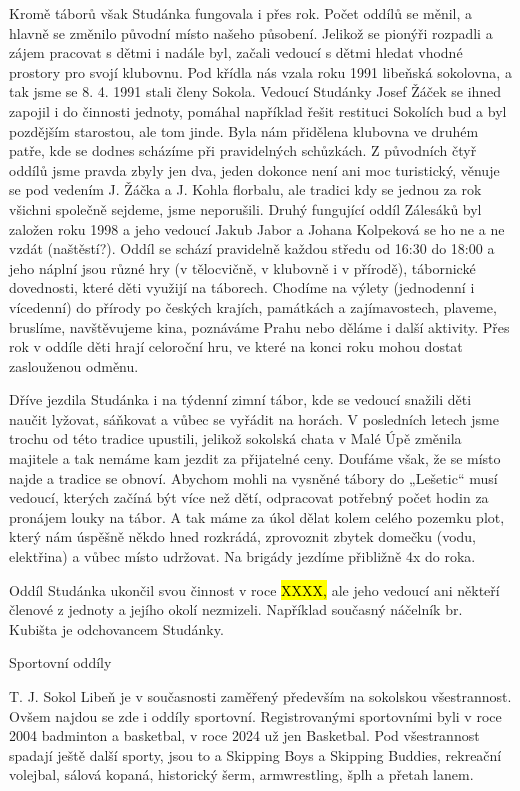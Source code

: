 Kromě táborů však Studánka fungovala i přes rok. Počet oddílů se měnil,
a hlavně se změnilo původní místo našeho působení. Jelikož se pionýři
rozpadli a zájem pracovat s dětmi i nadále byl, začali vedoucí s dětmi
hledat vhodné prostory pro svojí klubovnu. Pod křídla nás vzala roku
1991 libeňská sokolovna, a tak jsme se 8. 4. 1991 stali členy Sokola.
Vedoucí Studánky Josef Žáček se ihned zapojil i do činnosti jednoty,
pomáhal například řešit restituci Sokolích bud a byl pozdějším
starostou, ale tom jinde. Byla nám přidělena klubovna ve druhém patře,
kde se dodnes scházíme při pravidelných schůzkách. Z původních čtyř
oddílů jsme pravda zbyly jen dva, jeden dokonce není ani moc turistický,
věnuje se pod vedením J. Žáčka a J. Kohla florbalu, ale tradici kdy se
jednou za rok všichni společně sejdeme, jsme neporušili. Druhý fungující
oddíl Zálesáků byl založen roku 1998 a jeho vedoucí Jakub Jabor a Johana
Kolpeková se ho ne a ne vzdát (naštěstí?). Oddíl se schází pravidelně
každou středu od 16:30 do 18:00 a jeho náplní jsou různé hry (v
tělocvičně, v klubovně i v přírodě), tábornické dovednosti, které děti
využijí na táborech. Chodíme na výlety (jednodenní i vícedenní) do
přírody po českých krajích, památkách a zajímavostech, plaveme,
bruslíme, navštěvujeme kina, poznáváme Prahu nebo děláme i další
aktivity. Přes rok v oddíle děti hrají celoroční hru, ve které na konci
roku mohou dostat zaslouženou odměnu.

Dříve jezdila Studánka i na týdenní zimní tábor, kde se vedoucí snažili
děti naučit lyžovat, sáňkovat a vůbec se vyřádit na horách. V posledních
letech jsme trochu od této tradice upustili, jelikož sokolská chata v
Malé Úpě změnila majitele a tak nemáme kam jezdit za přijatelné ceny.
Doufáme však, že se místo najde a tradice se obnoví. Abychom mohli na
vysněné tábory do „Lešetic`` musí vedoucí, kterých začíná být více než
dětí, odpracovat potřebný počet hodin za pronájem louky na tábor. A tak
máme za úkol dělat kolem celého pozemku plot, který nám úspěšně někdo
hned rozkrádá, zprovoznit zbytek domečku (vodu, elektřina) a vůbec místo
udržovat. Na brigády jezdíme přibližně 4x do roka.

Oddíl Studánka ukončil svou činnost v roce \hl{XXXX,} ale jeho vedoucí
ani někteří členové z jednoty a jejího okolí nezmizeli. Například
současný náčelník br. Kubišta je odchovancem Studánky.

Sportovní oddíly

T. J. Sokol Libeň je v současnosti zaměřený především na sokolskou
všestrannost. Ovšem najdou se zde i oddíly sportovní. Registrovanými
sportovními byli v roce 2004 badminton a basketbal, v roce 2024 už jen
Basketbal. Pod všestrannost spadají ještě další sporty, jsou to a
Skipping Boys a Skipping Buddies, rekreační volejbal, sálová kopaná,
historický šerm, armwrestling, šplh a přetah lanem.

